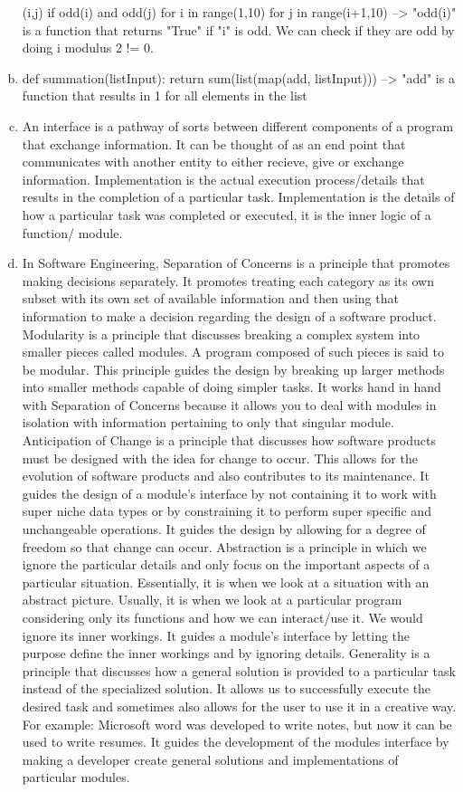 \documentclass[12pt]{article}
\begin{document}
\begin{enumerate}[a)]
\item [(i,j) if odd(i) and odd(j) for i in range(1,10) for j in range(i+1,10)] --> "odd(i)" is a function that returns "True" if "i" is odd. We can check if they are odd by doing i modulus 2 != 0.
\item def summation(listInput): return sum(list(map(add, listInput))) --> "add" is a function that results in 1 for all elements in the list
\item An interface is a pathway of sorts between different components of a program that exchange information. It can be thought of as an end point that communicates with another entity to either recieve, give or exchange information.
Implementation is the actual execution process/details that results in the completion of a particular task. Implementation is the details of how a particular task was completed or executed, it is the inner logic of a function/ module.
\item In Software Engineering, Separation of Concerns is a principle that promotes making decisions separately. It promotes treating each category as its own subset with its own set of available information and then using that information to make a decision regarding the design of a software product. 
Modularity is a principle that discusses breaking a complex system into smaller pieces called modules. A program composed of such pieces is said to be modular. This principle guides the design by breaking up larger methods into smaller methods capable of doing simpler tasks. It works hand in hand with Separation of Concerns because it allows you to deal with modules in isolation with information pertaining to only that singular module.
Anticipation of Change is a principle that discusses how software products must be designed with the idea for change to occur. This allows for the evolution of software products and also contributes to its maintenance.  It guides the design of a module’s interface by not containing it to work with super niche data types or by constraining it to perform super specific and unchangeable operations. It guides the design by allowing for a degree of freedom so that change can occur.
Abstraction is a principle in which we ignore the particular details and only focus on the important aspects of a particular situation. Essentially, it is when we look at a situation with an abstract picture. Usually, it is when we look at a particular program considering only its functions and how we can interact/use it. We would ignore its inner workings. It guides a module’s interface by letting the purpose define the inner workings and by ignoring details.
Generality is a principle that discusses how a general solution is provided to a particular task instead of the specialized solution. It allows us to successfully execute the desired task and sometimes also allows for the user to use it in a creative way. For example: Microsoft word was developed to write notes, but now it can be used to write resumes. It guides the development of the modules interface by making a developer create general solutions and implementations of particular modules.
\end{enumerate}
\end{document}
